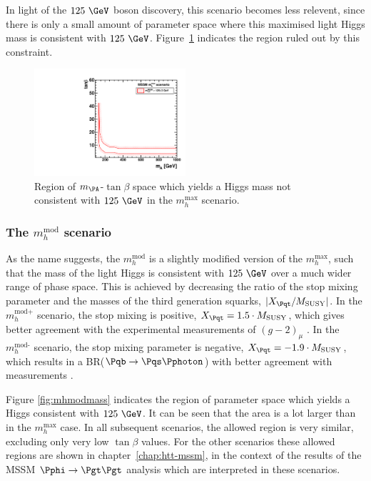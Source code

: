 In light of the $125~\GeV$ boson discovery, this scenario becomes less relevent,
since there is only a small amount of parameter space where this maximised light
Higgs mass is consistent with $125~\GeV$. Figure~\ref{fig:mhmaxmass} indicates
the region ruled out by this constraint. 

\begin{figure}[htbp]
   \includegraphics[width=0.5\textwidth]{plots/theory/cmb_mhmax-HypoTest.pdf}
\caption{Region of $m_{\PA}$-$\tan\beta$ space which yields a Higgs mass not
consistent with $125~\GeV$ in the $m_{h}^{\text{max}}$ scenario.}
\label{fig:mhmaxmass}
\end{figure}

\subsubsection{The $m_{h}^{\text{mod}}$ scenario}
\label{sec:mhmodscenario}

As the name suggests, the $m_{h}^{\text{mod}}$ is a slightly modified version of
the $m_{h}^{\text{max}}$, such that the mass of the light Higgs is consistent
with $125~\GeV$ over a much wider range of phase space. This is achieved by
decreasing the ratio of the stop mixing parameter and the masses of the third
generation squarks, $|X_{\Pqt}/M_{\text{SUSY}}|$. In the $m_{h}^{\text{mod+}}$
scenario, the stop mixing is positive, $X_{\Pqt} = 1.5 \cdot M_{\text{SUSY}}$,
which gives better agreement with the experimental measurements of $(g-2)_{\mu}$
\cite{Miller:2007kk}. In the $m_{h}^{\text{mod-}}$ scenario, the stop mixing parameter is
negative, $X_{\Pqt} = -1.9 \cdot M_{\text{SUSY}}$, which results in a
BR($\Pqb\to\Pqs\Pphoton$) with better agreement with measurements
\cite{Lees:2012wg}.

Figure \ref{fig:mhmodmass} indicates the region of parameter space which yields
a Higgs consistent with $125~\GeV$. It can be seen that the area is a lot larger
than in the $m_{h}^{\text{max}}$ case. In all subsequent scenarios, the allowed
region is very similar, excluding only very low $\tan\beta$ values. For the
other scenarios these allowed regions are shown in chapter~\ref{chap:htt-mssm},
in the context of the results of the MSSM $\Pphi \to \Pgt\Pgt$ analysis which
are interpreted in these scenarios.

